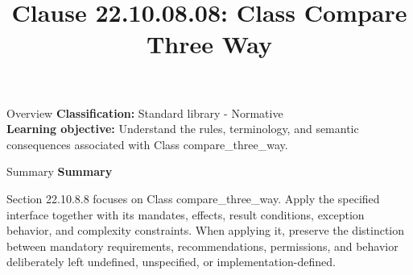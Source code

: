 \documentclass[10pt,letterpaper]{article}
\title{Clause 22.10.08.08: Class Compare Three Way}
\author{}
\date{}
\begin{document}
\maketitle
\begin{CornellOverviewBox}{Overview}
\textbf{Classification:} Standard library - Normative\\[2pt]
\textbf{Learning objective:} Understand the rules, terminology, and semantic consequences associated with Class compare\_three\_way.
\end{CornellOverviewBox}\begin{CornellSummaryBox}{Summary}
{\sffamily\bfseries\color{Accent} Summary}\par\vspace{3pt}Section 22.10.8.8 focuses on Class compare\_three\_way. Apply the specified interface together with its mandates, effects, result conditions, exception behavior, and complexity constraints. When applying it, preserve the distinction between mandatory requirements, recommendations, permissions, and behavior deliberately left undefined, unspecified, or implementation-defined.
\end{CornellSummaryBox}
\end{document}
